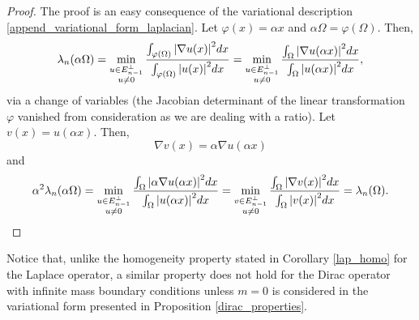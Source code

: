 \begin{proof}
    The proof is an easy consequence of the variational description \eqref{append_variational_form_laplacian}. Let \(\varphi(x) = \alpha x\) and \(\alpha \Omega = \varphi(\Omega)\). Then,
    \begin{equation*}
        \lambda_n(\alpha \Omega) = \min_{\substack{u \in E^\perp_{n-1} \\ u \neq 0}}  \frac{\int_{\varphi(\Omega)} \abs{\nabla u(x)}^2 dx}{\int_{\varphi(\Omega)} \abs{u(x)}^2 dx} = \min_{\substack{u \in E^\perp_{n-1} \\ u \neq 0}} \frac{\int_{\Omega} \abs{\nabla u(\alpha x)}^2 dx}{\int_{\Omega} \abs{u(\alpha x)}^2 dx},
    \end{equation*}
    via a change of variables (the Jacobian determinant of the linear transformation \(\varphi\) vanished from consideration as we are dealing with a ratio). Let \(v(x) = u(\alpha x)\). Then,
    \[
        \nabla v(x) = \alpha \nabla u (\alpha x)
    \]
    and
    \begin{equation*}
        \alpha^2\lambda_n(\alpha \Omega) = \min_{\substack{u \in E^\perp_{n-1} \\ u \neq 0}} \frac{\int_{\Omega} \abs{\alpha\nabla u(\alpha x)}^2 dx}{\int_{\Omega} \abs{u(\alpha x)}^2 dx} = \min_{\substack{v \in E^\perp_{n-1} \\ u \neq 0}} \frac{\int_{\Omega} \abs{\nabla v(x)}^2 dx}{\int_{\Omega} \abs{v(x)}^2 dx} = \lambda_n(\Omega).
    \end{equation*}
\end{proof}

\begin{remark}
    Notice that, unlike the homogeneity property stated in Corollary \ref{lap_homo} for the Laplace operator, a similar property does not hold for the Dirac operator with infinite mass boundary conditions unless \(m=0\) is considered in the variational form presented in Proposition \ref{dirac_properties}.
\end{remark}



